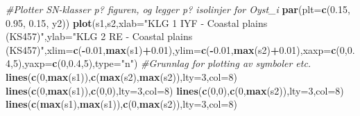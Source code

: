 \documentclass[]{article}
\newenvironment{Shaded}{\begin{snugshade}}{\end{snugshade}}
\newcommand{\CommentTok}[1]{\textcolor[rgb]{0.56,0.35,0.01}{\textit{#1}}}
\newcommand{\DataTypeTok}[1]{\textcolor[rgb]{0.13,0.29,0.53}{#1}}
\newcommand{\DecValTok}[1]{\textcolor[rgb]{0.00,0.00,0.81}{#1}}
\newcommand{\FloatTok}[1]{\textcolor[rgb]{0.00,0.00,0.81}{#1}}
\newcommand{\KeywordTok}[1]{\textcolor[rgb]{0.13,0.29,0.53}{\textbf{#1}}}
\newcommand{\NormalTok}[1]{#1}
\newcommand{\OperatorTok}[1]{\textcolor[rgb]{0.81,0.36,0.00}{\textbf{#1}}}
\newcommand{\StringTok}[1]{\textcolor[rgb]{0.31,0.60,0.02}{#1}}
\begin{document}
\begin{Shaded}
\begin{Highlighting}[]
\CommentTok{#Plotter SN-klasser p? figuren, og legger p? isolinjer for Oyst_i}
\KeywordTok{par}\NormalTok{(}\DataTypeTok{plt=}\KeywordTok{c}\NormalTok{(}\FloatTok{0.15}\NormalTok{, }\FloatTok{0.95}\NormalTok{, }\FloatTok{0.15}\NormalTok{, y2))}
\KeywordTok{plot}\NormalTok{(s1,s2,}\DataTypeTok{xlab=}\StringTok{"KLG 1 IYF - Coastal plains (KS457)"}\NormalTok{,}\DataTypeTok{ylab=}\StringTok{"KLG 2 RE - Coastal plains (KS457)"}\NormalTok{,}\DataTypeTok{xlim=}\KeywordTok{c}\NormalTok{(}\OperatorTok{-}\FloatTok{0.01}\NormalTok{,}\KeywordTok{max}\NormalTok{(s1)}\OperatorTok{+}\FloatTok{0.01}\NormalTok{),}\DataTypeTok{ylim=}\KeywordTok{c}\NormalTok{(}\OperatorTok{-}\FloatTok{0.01}\NormalTok{,}\KeywordTok{max}\NormalTok{(s2)}\OperatorTok{+}\FloatTok{0.01}\NormalTok{),}\DataTypeTok{xaxp=}\KeywordTok{c}\NormalTok{(}\DecValTok{0}\NormalTok{,}\FloatTok{0.4}\NormalTok{,}\DecValTok{5}\NormalTok{),}\DataTypeTok{yaxp=}\KeywordTok{c}\NormalTok{(}\DecValTok{0}\NormalTok{,}\FloatTok{0.4}\NormalTok{,}\DecValTok{5}\NormalTok{),}\DataTypeTok{type=}\StringTok{"n"}\NormalTok{) }\CommentTok{#Grunnlag for plotting av symboler etc.}
\KeywordTok{lines}\NormalTok{(}\KeywordTok{c}\NormalTok{(}\DecValTok{0}\NormalTok{,}\KeywordTok{max}\NormalTok{(s1)),}\KeywordTok{c}\NormalTok{(}\KeywordTok{max}\NormalTok{(s2),}\KeywordTok{max}\NormalTok{(s2)),}\DataTypeTok{lty=}\DecValTok{3}\NormalTok{,}\DataTypeTok{col=}\DecValTok{8}\NormalTok{)}
\KeywordTok{lines}\NormalTok{(}\KeywordTok{c}\NormalTok{(}\DecValTok{0}\NormalTok{,}\KeywordTok{max}\NormalTok{(s1)),}\KeywordTok{c}\NormalTok{(}\DecValTok{0}\NormalTok{,}\DecValTok{0}\NormalTok{),}\DataTypeTok{lty=}\DecValTok{3}\NormalTok{,}\DataTypeTok{col=}\DecValTok{8}\NormalTok{)}
\KeywordTok{lines}\NormalTok{(}\KeywordTok{c}\NormalTok{(}\DecValTok{0}\NormalTok{,}\DecValTok{0}\NormalTok{),}\KeywordTok{c}\NormalTok{(}\DecValTok{0}\NormalTok{,}\KeywordTok{max}\NormalTok{(s2)),}\DataTypeTok{lty=}\DecValTok{3}\NormalTok{,}\DataTypeTok{col=}\DecValTok{8}\NormalTok{)}
\KeywordTok{lines}\NormalTok{(}\KeywordTok{c}\NormalTok{(}\KeywordTok{max}\NormalTok{(s1),}\KeywordTok{max}\NormalTok{(s1)),}\KeywordTok{c}\NormalTok{(}\DecValTok{0}\NormalTok{,}\KeywordTok{max}\NormalTok{(s2)),}\DataTypeTok{lty=}\DecValTok{3}\NormalTok{,}\DataTypeTok{col=}\DecValTok{8}\NormalTok{)}


\end{Highlighting}
\end{Shaded}
\end{document}
